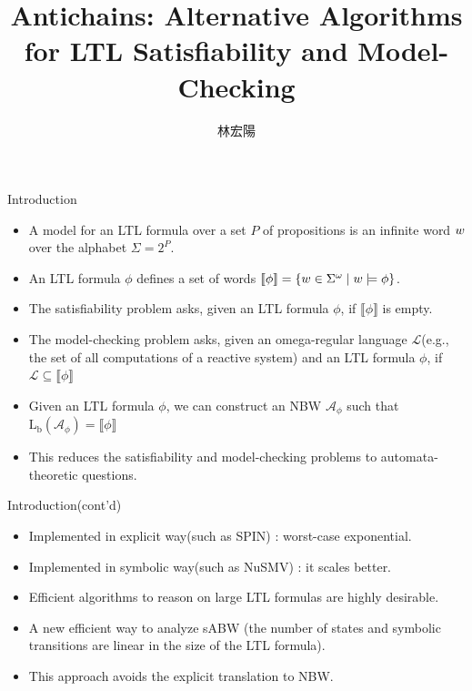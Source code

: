 \documentclass[12pt]{beamer}
\title{Antichains: Alternative Algorithms for LTL Satisfiability and Model-Checking}
\author{林宏陽}
\begin{document}
\begin{frame}
	\maketitle
\end{frame}

\begin{frame}{Introduction}
	\begin{itemize}
		\item A model for an LTL formula over a set $P$ of propositions is an infinite word $\mathnormal{w}$ over the alphabet $\Sigma = 2^{P}$.
		\item An LTL formula $\phi$ defines a set of words $\llbracket \phi \rrbracket = \{\mathnormal{w} \in \Sigma^{\omega} \mid \mathnormal{w} \models \phi\}$.
		\item The satisfiability problem asks, given an LTL formula $\phi$, if $\llbracket \phi \rrbracket$ is empty.
		\item The model-checking problem asks, given an omega-regular language $\mathcal{L}$(e.g., the set of all computations of a reactive system) and an LTL formula $\phi$, if $\mathcal{L} \subseteq \llbracket \phi \rrbracket$
		\item Given an LTL formula $\phi$, we can construct an NBW $\mathcal{A}_{\phi}$ such that $\text{L}_{\text{b}}(\mathcal{A}_{\phi}) = \llbracket \phi \rrbracket$
		\item This reduces the satisfiability and model-checking problems to automata-theoretic questions.
	\end{itemize}
\end{frame}

\begin{frame}{Introduction(cont'd)}
	\begin{itemize}
		\item Implemented in explicit way(such as SPIN) : worst-case exponential.
		\item Implemented in symbolic way(such as NuSMV) : it scales better.
		\item Efficient algorithms to reason on large LTL formulas are highly desirable.
		\item A new efficient way to analyze sABW (the number of states and symbolic transitions are linear in the size of the LTL formula).
		\item This approach avoids the explicit translation to NBW.
	\end{itemize}
\end{frame}
\end{document}
